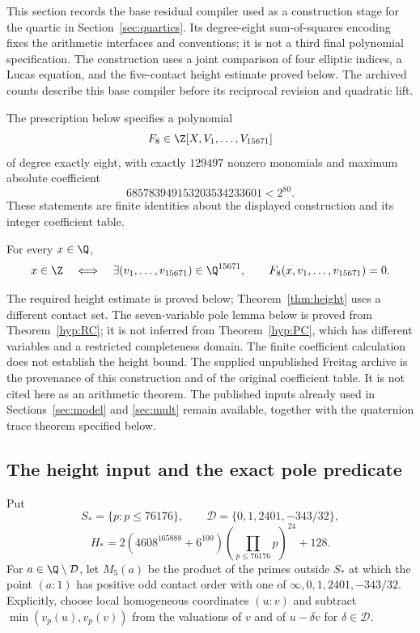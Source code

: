 This section records the base residual compiler used as a construction
stage for the quartic in Section~\ref{sec:quartics}. Its degree-eight
sum-of-squares encoding fixes the arithmetic interfaces and conventions;
it is not a third final polynomial specification. The construction uses
a joint comparison of four elliptic indices, a Lucas equation, and the
five-contact height estimate proved below. The archived counts describe
this base compiler before its reciprocal revision and quadratic lift.

\begin{proposition}\label{prop:o8-finite}
The prescription below specifies a polynomial
\[
 F_8\in\Z[X,V_1,\ldots,V_{15671}]
\]
of degree exactly eight, with exactly $129497$ nonzero monomials and
maximum absolute coefficient
\[
 685783949153203534233601<2^{80}.
\]
These statements are finite identities about the displayed construction
and its integer coefficient table.
\end{proposition}

\begin{theorem}\label{thm:o8-conditional}
For every
$x\in\Q$,
\[
 x\in\Z\quad\Longleftrightarrow\quad
 \exists(v_1,\ldots,v_{15671})\in\Q^{15671},\qquad
 F_8(x,v_1,\ldots,v_{15671})=0.
\]
\end{theorem}

The required height estimate is proved below; Theorem~\ref{thm:height}
uses a different contact set. The seven-variable pole lemma below is proved from
Theorem~\ref{hyp:RC}; it is not inferred from Theorem~\ref{hyp:PC},
which has different variables and a restricted completeness domain.
The finite coefficient calculation does not establish the height bound.
The supplied unpublished Freitag archive is the provenance of this
construction and of the original coefficient table. It is not cited here
as an arithmetic theorem. The published inputs already used in
Sections~\ref{sec:model} and \ref{sec:mult} remain
available, together with the quaternion trace theorem specified below.

\subsection{The height input and the exact pole predicate}

Put
\[
 S_* =\{p:p\le76176\},\qquad
 \mathcal D=\{0,1,2401,-343/32\},
\]
\[
 H_*=2(4608^{165888}+6^{100})
          \left(\prod_{p\le76176}p\right)^{24}+128.
\]
For $a\in\Q\setminus\mathcal D$, let $M_5(a)$ be the product of
the primes outside $S_*$ at which the point $(a:1)$ has positive odd
contact order with one of $\infty,0,1,2401,-343/32$. Explicitly, choose
local homogeneous coordinates $(u:v)$ and subtract
$\min(v_p(u),v_p(v))$ from the valuations of $v$ and of
$u-\delta v$ for $\delta\in\mathcal D$.

